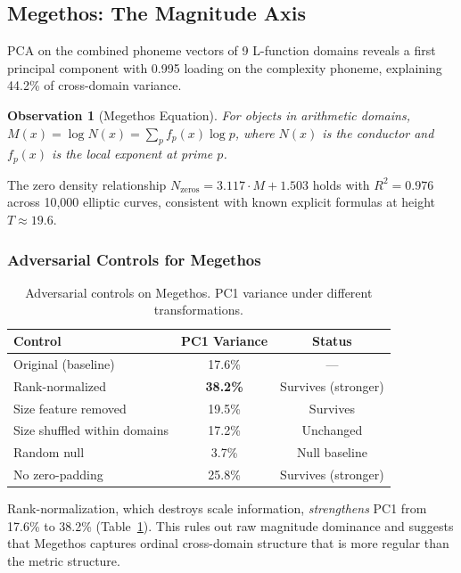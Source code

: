 \documentclass[11pt,a4paper]{article}
\newtheorem{observation}{Observation}
\begin{document}
\subsection{Megethos: The Magnitude Axis}

PCA on the combined phoneme vectors of 9 L-function domains reveals a first principal component with 0.995 loading on the complexity phoneme, explaining 44.2\% of cross-domain variance.

\begin{observation}[Megethos Equation]
For objects in arithmetic domains, $M(x) = \log N(x) = \sum_p f_p(x) \log p$, where $N(x)$ is the conductor and $f_p(x)$ is the local exponent at prime $p$.
\end{observation}

The zero density relationship $N_{\text{zeros}} = 3.117 \cdot M + 1.503$ holds with $R^2 = 0.976$ across 10,000 elliptic curves, consistent with known explicit formulas at height $T \approx 19.6$.

\subsubsection{Adversarial Controls for Megethos}

\begin{table}[h]
\centering
\caption{Adversarial controls on Megethos. PC1 variance under different transformations.}
\label{tab:controls}
\begin{tabular}{lcc}
\toprule
Control & PC1 Variance & Status \\
\midrule
Original (baseline) & 17.6\% & --- \\
Rank-normalized & \textbf{38.2\%} & Survives (stronger) \\
Size feature removed & 19.5\% & Survives \\
Size shuffled within domains & 17.2\% & Unchanged \\
Random null & 3.7\% & Null baseline \\
No zero-padding & 25.8\% & Survives (stronger) \\
\bottomrule
\end{tabular}
\end{table}

Rank-normalization, which destroys scale information, \emph{strengthens} PC1 from 17.6\% to 38.2\% (Table~\ref{tab:controls}). This rules out raw magnitude dominance and suggests that Megethos captures ordinal cross-domain structure that is more regular than the metric structure.
\end{document}
